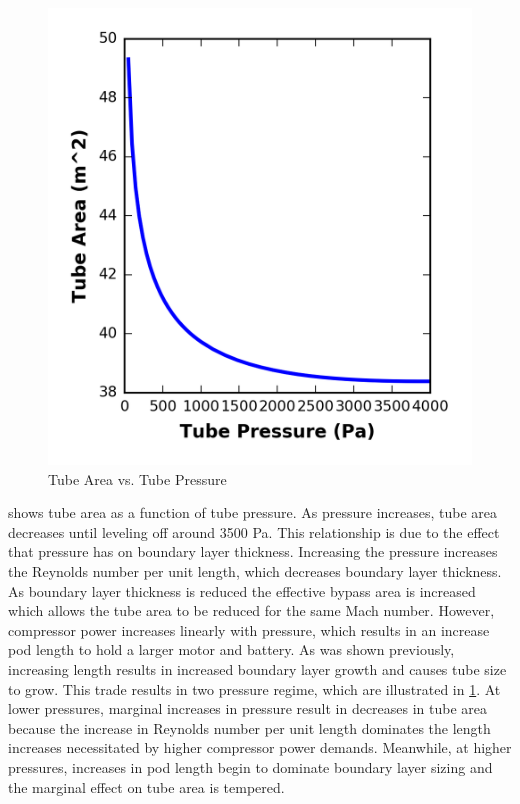 \begin{figure}
	\centering
	\includegraphics{../../images/graphs/pressure_trades/pressure_vs_Area.png}
	\caption{Tube Area vs. Tube Pressure}
	\label{fig:tube_area_vs_tube_press}
\end{figure}
 shows tube area as a function of tube pressure. As pressure increases, tube area decreases until leveling off around 3500 Pa. This relationship is due to the effect that pressure has on boundary layer thickness. Increasing the pressure increases the Reynolds number per unit length, which decreases boundary layer thickness. As boundary layer thickness is reduced the effective bypass area is increased which allows the tube area to be reduced for the same Mach number. However, compressor power increases linearly with pressure, which results in an increase pod length to hold a larger motor and battery. As was shown previously, increasing length results in increased boundary layer growth and causes tube size to grow. This trade results in two pressure regime, which are illustrated in \cref{fig:tube_area_vs_tube_press}. At lower pressures, marginal increases in pressure result in decreases in tube area because the increase in Reynolds number per unit length dominates the length increases necessitated by higher compressor power demands. Meanwhile, at higher pressures, increases in pod length begin to dominate boundary layer sizing and the marginal effect on tube area is tempered.
